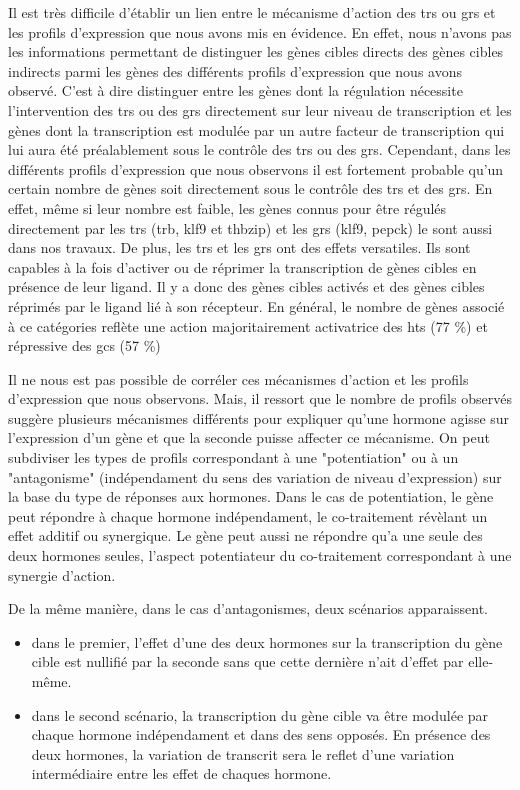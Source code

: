 \documentclass[../main.tex]{subfiles}
\begin{document}
Il est très difficile d'établir un lien entre le mécanisme d'action des \glspl{tr} ou \glspl{gr} et les profils d'expression que nous avons mis en évidence.
En effet, nous n'avons pas les informations permettant de distinguer les gènes cibles directs des gènes cibles indirects parmi les gènes des différents profils d'expression que nous avons observé.
C'est à dire distinguer entre les gènes dont la régulation nécessite l'intervention des \glspl{tr} ou des \glspl{gr} directement sur leur niveau de transcription et les gènes dont la transcription est modulée par un autre facteur de transcription qui lui aura été préalablement sous le contrôle des \glspl{tr} ou des \glspl{gr}.
Cependant, dans les différents profils d'expression que nous observons il est fortement probable qu'un certain nombre de gènes soit directement sous le contrôle des \glspl{tr} et des \glspl{gr}.
En effet, même si leur nombre est faible, les gènes connus pour être régulés directement par les \glspl{tr} (\gls{trb}, \gls{klf9} et \gls{thbzip}) et les \glspl{gr} (\gls{klf9}, \gls{pepck}) le sont aussi dans nos travaux.
De plus, les \glspl{tr} et les \glspl{gr} ont des effets versatiles.
Ils sont capables à la fois d'activer ou de réprimer la transcription de gènes cibles en présence de leur ligand.
Il y a donc des gènes cibles activés et des gènes cibles réprimés par le ligand lié à son récepteur.
En général, le nombre de gènes associé à ce catégories reflète une action majoritairement activatrice des \glspl{ht} (77 \%) et répressive des \glspl{gc} (57 \%) 
\par
Il ne nous est pas possible de corréler ces mécanismes d'action et les profils d'expression que nous observons.
Mais, il ressort que le nombre de profils observés suggère plusieurs mécanismes différents pour expliquer qu'une hormone agisse sur l'expression d'un gène et que la seconde puisse affecter ce mécanisme.
On peut subdiviser les types de profils correspondant à une "potentiation" ou à un "antagonisme" (indépendament du sens des variation de niveau d'expression) sur la base du type de réponses aux hormones.
Dans le cas de potentiation, le gène peut répondre à chaque hormone indépendament, le co-traitement révèlant un effet additif ou synergique.
Le gène peut aussi ne répondre qu'a une seule des deux hormones seules, l'aspect potentiateur du co-traitement correspondant à une synergie d'action.
\par
De la même manière, dans le cas d'antagonismes, deux scénarios apparaissent.
\begin{itemize}
\item dans le premier, l'effet d'une des deux hormones sur la transcription du gène cible est nullifié par la seconde sans que cette dernière n'ait d'effet par elle-même.
\item dans le second scénario, la transcription du gène cible va être modulée par chaque hormone indépendament et dans des sens opposés.
En présence des deux hormones, la variation de transcrit sera le reflet d'une variation intermédiaire entre les effet de chaques hormone.
\end{itemize}
\end{document}

